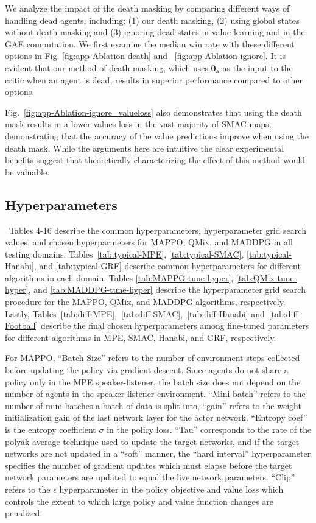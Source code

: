 We analyze the impact of the death masking by comparing different ways of handling dead agents, including: (1) our death masking, (2) using global states without death masking and (3) ignoring dead states in value learning and in the GAE computation. We first examine the median win rate with these different options in Fig. \ref{fig:app-Ablation-death} and ~\ref{fig:app-Ablation-ignore}. It is evident that our method of death masking, which uses $\boldsymbol{0_a}$ as the input to the critic when an agent is dead, results in superior performance compared to other options. 

Fig.~\ref{fig:app-Ablation-ignore_valueloss} also demonstrates that using the death mask results in a lower values loss in the vast majority of SMAC maps, demonstrating that the accuracy of the value predictions improve when using the death mask. While the arguments here are intuitive the clear experimental benefits suggest that theoretically characterizing the effect of this method would be valuable. 


\subsection{Hyperparameters}
\
Tables 4-16 describe the common hyperparameters, hyperparameter grid search values, and chosen hyperparmeters for MAPPO, QMix, and MADDPG in all testing domains. Tables~\ref{tab:typical-MPE}, \ref{tab:typical-SMAC}, \ref{tab:typical-Hanabi}, and \ref{tab:typical-GRF} describe common hyperparameters for different algorithms in each domain. Tables \ref{tab:MAPPO-tune-hyper}, \ref{tab:QMix-tune-hyper}, and \ref{tab:MADDPG-tune-hyper} describe the hyperparameter grid search procedure for the MAPPO, QMix, and MADDPG algorithms, respectively. Lastly, Tables~\ref{tab:diff-MPE},~\ref{tab:diff-SMAC},~\ref{tab:diff-Hanabi} and~\ref{tab:diff-Football} describe the final chosen hyperparameters among fine-tuned parameters for different algorithms in MPE, SMAC, Hanabi, and GRF, respectively. 

For MAPPO, ``Batch Size'' refers to the number of environment steps collected before updating the policy via gradient descent. Since agents do not share a policy only in the MPE speaker-listener, the batch size does not depend on the number of agents in the speaker-listener environment. ``Mini-batch'' refers to the number of mini-batches a batch of data is split into, ``gain'' refers to the weight initialization gain of the last network layer for the actor network. ``Entropy coef'' is the entropy coefficient $\sigma$ in the policy loss. ``Tau'' corresponds to the rate of the polyak average technique used to update the target networks, and if the target networks are not updated in a ``soft'' manner, the ``hard interval'' hyperparameter specifies the number of gradient updates which must elapse before the target network parameters are updated to equal the live network parameters. ``Clip'' refers to the $\epsilon$ hyperparameter in the policy objective and value loss which controls the extent to which large policy and value function changes are penalized. 

